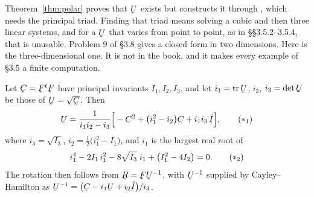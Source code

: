 Theorem~\ref{thm:polar} proves that $\bU$ exists but constructs it through
, which needs the principal triad. Finding that triad means
solving a cubic and then three linear systems, and for a $\bU$ that varies
from point to point, as in \S\S3.5.2--3.5.4, that is unusable. Problem 9
of \S3.8 gives a closed form in two dimensions. Here is the
three-dimensional one. It is not in the book, and it makes every example
of \S3.5 a finite computation.

\begin{theorem}\label{thm:Uclosed}
Let $\bC=\bF^{t}\bF$ have principal invariants $I_{1},I_{2},I_{3}$, and let
$i_{1}=\tr\bU$, $i_{2}$, $i_{3}=\det\bU$ be those of $\bU=\sqrt{\bC}$.
Then
\begin{equation}
   \bU=\frac{1}{i_{1}i_{2}-i_{3}}
       \Big[-\bC^{2}+\big(i_{1}^{2}-i_{2}\big)\bC
            +i_{1}i_{3}\,\hI\Big],
   \tag{$\ast_{1}$}
\end{equation}
where $i_{3}=\sqrt{I_{3}}$, $i_{2}=\tfrac12\big(i_{1}^{2}-I_{1}\big)$, and
$i_{1}$ is the largest real root of
\begin{equation}
   i_{1}^{4}-2I_{1}\,i_{1}^{2}-8\sqrt{I_{3}}\;i_{1}
     +\big(I_{1}^{2}-4I_{2}\big)=0 .
   \tag{$\ast_{2}$}
\end{equation}
The rotation then follows from $\bR=\bF\bU^{-1}$, with $\bU^{-1}$ supplied
by Cayley--Hamilton as
$\bU^{-1}=\big(\bC-i_{1}\bU+i_{2}\hI\big)/i_{3}$.
\end{theorem}

